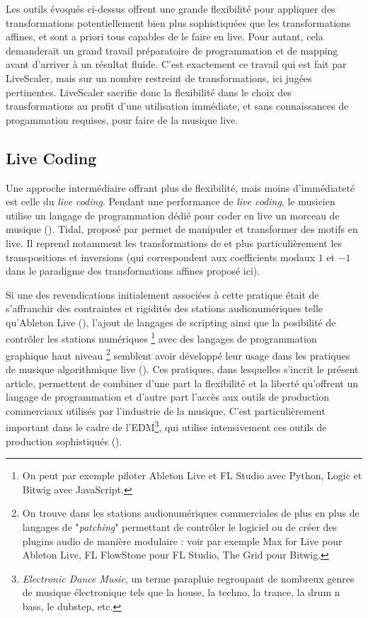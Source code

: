 Les outils évoqués ci-dessus offrent une grande flexibilité pour appliquer des transformations potentiellement bien plus sophistiquées que les transformations affines, et sont a priori tous capables de le faire en live. Pour autant, cela demanderait un grand travail préparatoire de programmation et de mapping avant d'arriver à un résultat fluide. C'est exactement ce travail qui est fait par LiveScaler, mais sur un nombre restreint de transformations, ici jugées pertinentes. LiveScaler sacrifie donc la flexibilité dans le choix des transformations au profit d'une utilisation immédiate, et sans connaissances de progammation requises, pour faire de la musique live.

\subsection{Live Coding}

Une approche intermédiaire offrant plus de flexibilité, mais moins d'immédiateté est celle du \emph{live coding}. Pendant une performance de \emph{live coding}, le musicien utilise un langage de programmation dédié pour coder en live un morceau de musique (\cite{blackwell2022live}). Tidal, proposé par \textcite{mclean2010tidal} permet de manipuler et transformer des motifs en live. Il reprend notamment les transformations de \textcite{spiegel1981manipulations} et plus particulièrement les transpositions et inversions (qui correspondent aux coefficients modaux $1$ et $-1$ dans le paradigme des transformations affines proposé ici).

Si une des revendications initialement associées à cette pratique était de s'affranchir des contraintes et rigidités des stations audionumériques telle qu'Ableton Live (\cite{collins2003live}), l'ajout de langages de scripting  ainsi que la posibilité de contrôler les stations numériques \footnote{On peut par exemple piloter  Ableton Live et FL Studio avec Python, Logic et Bitwig avec JavaScript.} avec des langages de programmation graphique haut niveau \footnote{On trouve dans les stations audionumériques commerciales de plus en plus de langages de "\emph{patching}" permettant de contrôler le logiciel ou de créer des plugins audio de manière modulaire : voir par exemple Max for Live pour Ableton Live, FL FlowStone pour FL Studio, The Grid pour Bitwig.} semblent avoir développé leur usage dans les pratiques de musique algorithmique live (\cite{collins2014algorave}). Ces pratiques, dans lesquelles s'incrit le présent article, permettent de combiner d'une part la flexibilité et la liberté qu'offrent un langage de programmation et d'autre part l'accès aux outils de production commerciaux utilisés par l'industrie de la musique. C'est particulièrement important dans le cadre de l'EDM\footnote{\emph{Electronic Dance Music}, un terme parapluie regroupant de nombreux genres de musique électronique tels que la house, la techno, la trance, la drum n bass, le dubstep, etc. }, qui utilise intensivement ces outils de production sophistiqués (\cite{fraser2012spaces}).


